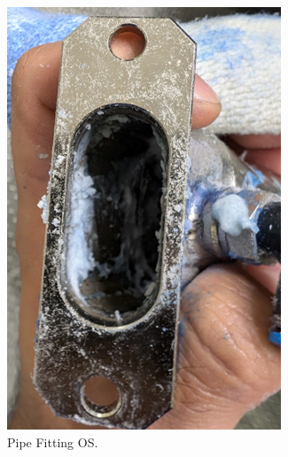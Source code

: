 \begin{figure}[H]
\centering
  \begin{subfigure}{0.45\textwidth}
  \centering
    \includegraphics[width=0.8\linewidth]{FIGURES/Fib3.png}
    \caption{Pipe Fitting OS.}
  \end{subfigure}
  \begin{subfigure}{0.45\textwidth}
  \centering

\end{subfigure}
\end{figure}
